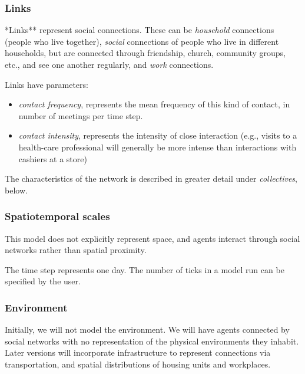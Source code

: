 \documentclass[nofonts,]{tufte-handout}
\providecommand{\tightlist}{%
  \setlength{\itemsep}{0pt}\setlength{\parskip}{0pt}}
\begin{document}
\hypertarget{links}{%
\subsubsection{Links}\label{links}}

*Links** represent social connections. These can be \emph{household}
connections (people who live together), \emph{social} connections of
people who live in different households, but are connected through
friendship, church, community groups, etc., and see one another
regularly, and \emph{work} connections.

Links have parameters:

\begin{itemize}
\tightlist
\item
  \emph{contact frequency}, represents the mean frequency of this kind
  of contact, in number of meetings per time step.
\item
  \emph{contact intensity}, represents the intensity of close
  interaction (e.g., visits to a health-care professional will generally
  be more intense than interactions with cashiers at a store)
\end{itemize}

The characteristics of the network is described in greater detail under
\emph{collectives}, below.

\hypertarget{spatiotemporal-scales}{%
\subsubsection{Spatiotemporal scales}\label{spatiotemporal-scales}}

This model does not explicitly represent space, and agents interact
through social networks rather than spatial proximity.

The time step represents one day. The number of ticks in a model run can
be specified by the user.

\hypertarget{environment}{%
\subsubsection{Environment}\label{environment}}

Initially, we will not model the environment. We will have agents
connected by social networks with no representation of the physical
environments they inhabit. Later versions will incorporate
infrastructure to represent connections via transportation, and spatial
distributions of housing units and workplaces.
\end{document}

